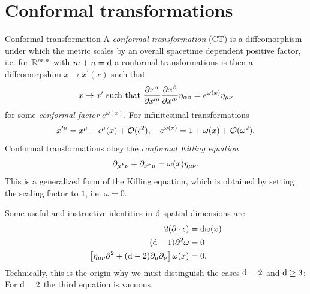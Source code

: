 \section{Conformal transformations}
\begin{mybox}{Conformal transformation}
	A \emph{conformal transformation} (CT) is a diffeomorphism under which the metric scales by an overall spacetime dependent positive factor,
i.e. for $\mathbb{R}^{m,n}$ with $m+n=\mathrm{d}$ a conformal transformations is then a diffeomorpshim $x\rightarrow x^\prime(x)$ such that
	\begin{equation}
	\label{eq:ctFull}
		x \rightarrow x^\prime \text{ such that } \frac{\partial x^\alpha}{\partial x^{\prime \mu}} \frac{\partial x^\beta}{\partial x^{\prime \nu}} \eta_{\alpha \beta} = e^{\omega(x)} \eta_{\mu \nu} 
	\end{equation}
	for some \emph{conformal factor} $e^{\omega(x)}$.  For infinitesimal transformations
	\begin{equation}
	\label{eq:ctInfinitesimal}
		x^{\prime \mu} = x^\mu - \epsilon^\mu (x) + \mathcal{O}(\epsilon^2), \quad e^{\omega(x)} = 1 + \omega(x) + \mathcal{O}(\omega^2).
	\end{equation}
	Conformal transformations obey the \emph{conformal Killing equation}
	\begin{equation}
		\label{eq:ctKilling}
		\partial_\mu \epsilon_\nu + \partial_\nu \epsilon_\mu = \omega(x) \eta_{\mu \nu}.
	\end{equation}
	This is a generalized form of the Killing equation, which is obtained by setting the scaling factor to $1$, i.e. $\omega=0$.
\end{mybox}
Some useful and instructive identities in $\mathrm{d}$ spatial dimensions are
\begin{align}
	\label{eq:ctConstraints}
	2 (\partial \cdot \epsilon) & = \mathrm{d} \omega(x) \nonumber \\
	(\mathrm{d}-1)\partial^2 \omega &= 0 \nonumber \\
	\left[\eta_{\mu \nu} \partial^2+(\mathrm{d}-2) \partial_\mu \partial_\nu \right] \omega(x) &= 0.
\end{align}
Technically, this is the origin why we must distinguish the cases $\mathrm{d}=2$ and $\mathrm{d}\geq 3$: \\
For $\mathrm{d}=2$ the third equation is vacuous.
